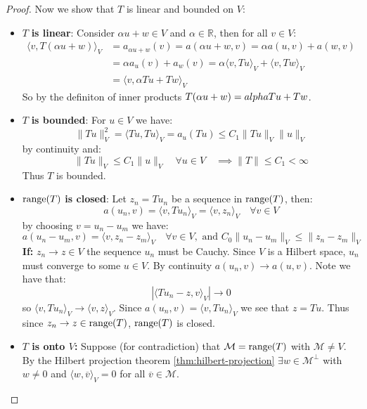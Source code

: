 \begin{proof}
    Now we show that $T$ is linear and bounded on $V$:
    \begin{itemize}
        \item $T$ \textbf{is linear}: Consider $\alpha u + w \in V$ and $\alpha \in \mathbb{R}$, then for all $v \in V$:
              \begin{align*}
                  \langle v, T(\alpha u + w) \rangle_V & = a_{\alpha u + w}(v) = a(\alpha u + w, v) = \alpha a(u, v) + a(w, v)                 \\
                                                       & = \alpha a_u(v) + a_w(v) = \alpha \langle v, T u \rangle_V + \langle v, T w \rangle_V \\
                                                       & = \langle v, \alpha T u + T w \rangle_V
              \end{align*}
              So by the definiton of inner products $T(\alpha u + w) = \\alpha T u + T w$.
        \item $T$ \textbf{is bounded}: For $u \in V$ we have:
              \[
                  \|T u\|_V^2  = \langle T u, T u \rangle_V = a_u(T u) \leq C_1 \|T u\|_V \|u\|_V
              \]
              by continuity and:
              \[
                  \|T u\|_V \leq C_1 \|u\|_V \quad \forall u \in V \quad \implies \|T\| \leq C_1 < \infty
              \]
              Thus $T$ is bounded.
        \item $\operatorname{range}(T)$ \textbf{is closed}: Let $z_n = T u_n$ be a sequence in $\operatorname{range}(T)$, then:
              \[
                  a(u_n, v) = \langle v, T u_n \rangle_V = \langle v, z_n \rangle_V \quad \forall v \in V
              \]
              by choosing $v = u_n - u_m$ we have:
              \[
                  a(u_n - u_m, v)  = \langle v, z_n - z_m \rangle_V \quad \forall v \in V, \text{ and } C_0 \|u_n - u_m\|_V \leq \|z_n - z_m\|_V
              \]
              \textbf{If:} $z_n \to z \in V$ the sequence $u_n$ must be Cauchy. Since $V$ is a Hilbert space, $u_n$ must converge to some $u \in V$.
              By continuity $a(u_n, v) \to a(u, v)$. Note we have that:
              \[
                  |\langle T u_n - z, v \rangle_V| \to 0
              \]
              so $\langle v, T u_n \rangle_V \to \langle v, z \rangle_V$. Since $a(u_n, v) = \langle v, T u_n \rangle_V$ we see that $z = T u$. Thus since $z_n \to z \in \operatorname{range}(T)$, $\operatorname{range}(T)$ is closed.
        \item \textbf{$T$ is onto $V$:} Suppose (for contradiction) that $\mathcal{M} = \operatorname{range}(T)$ with $\mathcal{M} \neq V$. By the Hilbert projection theorem \ref{thm:hilbert-projection} $\exists w \in \mathcal{M}^\perp$ with $w \neq 0$ and $\langle w, \overline{v} \rangle_V = 0$ for all $\overline{v} \in \mathcal{M}$.

\end{itemize}
\end{proof}
